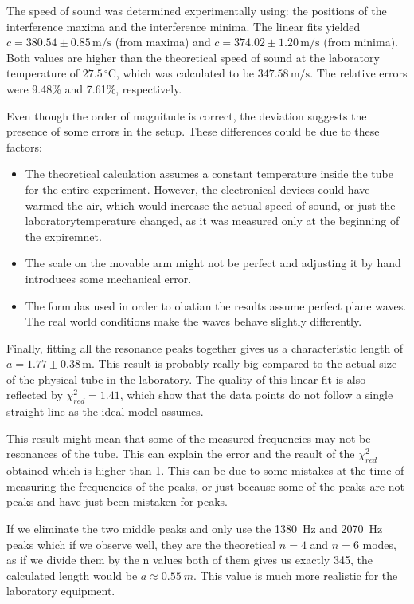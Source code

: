 \documentclass[a4paper,11pt]{article}
\begin{document}
The speed of sound was determined experimentally using: the positions of the interference maxima and the interference minima. The linear fits yielded $c = 380.54 \pm 0.85\,\mathrm{m/s}$ (from maxima) and $c = 374.02 \pm 1.20\,\mathrm{m/s}$ (from minima). Both values are higher than the theoretical speed of sound at the laboratory temperature of $27.5\,^{\circ}\mathrm{C}$, which was calculated to be $347.58\,\mathrm{m/s}$. The relative errors were 9.48\% and 7.61\%, respectively.

Even though the order of magnitude is correct, the deviation suggests the presence of some errors in the setup. These differences could be due to these factors:
\begin{itemize}
    \item The theoretical calculation assumes a constant temperature inside the tube for the entire experiment. However, the electronical devices could have warmed the air, which would increase the actual speed of sound, or just the laboratorytemperature changed, as it was measured only at the beginning of the expiremnet.
    \item The scale on the movable arm might not be perfect and adjusting it by hand introduces some mechanical error.
    \item The formulas used in order to obatian the results assume perfect plane waves. The real world conditions make the waves behave slightly differently.
\end{itemize}

Finally, fitting all the resonance peaks together gives us a characteristic length of $a = \ensuremath{1.77 \pm 0.38\,\mathrm{m}}$. This result is probably really big compared to the actual size of the physical tube in the laboratory. The quality of this linear fit is also reflected by $\chi^2_{red} = 1.41$, which show that the data points do not follow a single straight line as the ideal model assumes.

This result might mean that some of the measured frequencies may not be resonances of the tube. This can explain the error and the reault of the $\chi^2_{red}$ obtained which is higher than 1. This can be due to some mistakes at the time of measuring the frequencies of the peaks, or just because some of the peaks are not peaks and have just been mistaken for peaks.

If we eliminate the two middle peaks and only use the \qty{1380}{Hz} and \qty{2070}{Hz} peaks which if we observe well, they are the theoretical $n=4$ and $n=6$ modes, as if we divide them by the n values both of them gives us exactly 345, the calculated length would be $a \approx \qty{0.55}{m}$. This value is much more realistic for the laboratory equipment.
\end{document}
